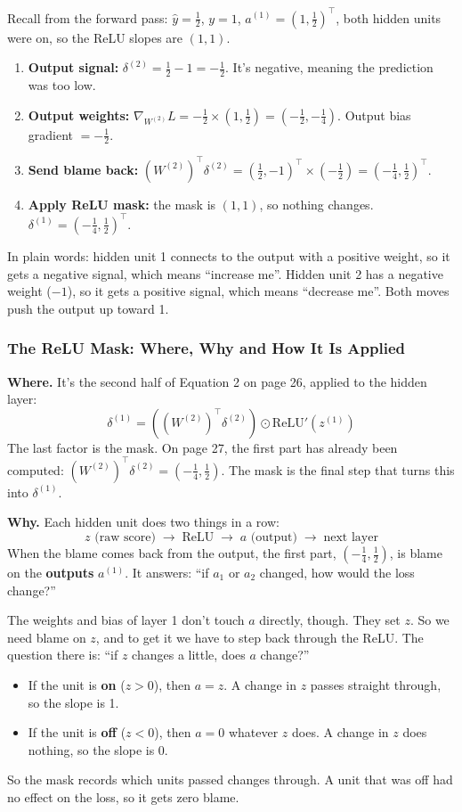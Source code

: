 Recall from the forward pass: $\hat{y}=\tfrac12$, $y=1$, $a^{(1)}=(1, \tfrac12)^{\top}$, both hidden units were on, so the ReLU slopes are $(1,1)$.

\begin{enumerate}[leftmargin=*]
  \item \textbf{Output signal:} $\delta^{(2)} = \tfrac12 - 1 = -\tfrac12$. It's negative, meaning the prediction was too low.
  \item \textbf{Output weights:} $\nabla_{W^{(2)}} L = -\tfrac12 \times (1, \tfrac12) = (-\tfrac12, -\tfrac14)$. Output bias gradient $= -\tfrac12$.
  \item \textbf{Send blame back:} $\left(W^{(2)}\right)^{\top}\delta^{(2)} = (\tfrac12, -1)^{\top} \times (-\tfrac12) = (-\tfrac14, \tfrac12)^{\top}$.
  \item \textbf{Apply ReLU mask:} the mask is $(1,1)$, so nothing changes. $\delta^{(1)} = (-\tfrac14, \tfrac12)^{\top}$.
\end{enumerate}

In plain words: hidden unit 1 connects to the output with a positive weight, so it gets a negative signal, which means ``increase me''. Hidden unit 2 has a negative weight ($-1$), so it gets a positive signal, which means ``decrease me''. Both moves push the output up toward 1.

\subsubsection*{The ReLU Mask: Where, Why and How It Is Applied}

\textbf{Where.} It's the second half of Equation 2 on page 26, applied to the hidden layer:
\[
\delta^{(1)} = \left( \left(W^{(2)}\right)^{\top} \delta^{(2)} \right) \odot \mathrm{ReLU}'(z^{(1)})
\]
The last factor is the mask. On page 27, the first part has already been computed: $\left(W^{(2)}\right)^{\top}\delta^{(2)} = (-\tfrac14, \tfrac12)$. The mask is the final step that turns this into $\delta^{(1)}$.

\textbf{Why.} Each hidden unit does two things in a row:
\[
z \text{ (raw score)} \;\to\; \mathrm{ReLU} \;\to\; a \text{ (output)} \;\to\; \text{next layer}
\]
When the blame comes back from the output, the first part, $(-\tfrac14, \tfrac12)$, is blame on the \textbf{outputs} $a^{(1)}$. It answers: ``if $a_1$ or $a_2$ changed, how would the loss change?''

The weights and bias of layer 1 don't touch $a$ directly, though. They set $z$. So we need blame on $z$, and to get it we have to step back through the ReLU. The question there is: ``if $z$ changes a little, does $a$ change?''
\begin{itemize}[leftmargin=*]
  \item If the unit is \textbf{on} ($z>0$), then $a=z$. A change in $z$ passes straight through, so the slope is 1.
  \item If the unit is \textbf{off} ($z<0$), then $a=0$ whatever $z$ does. A change in $z$ does nothing, so the slope is 0.
\end{itemize}
So the mask records which units passed changes through. A unit that was off had no effect on the loss, so it gets zero blame.

